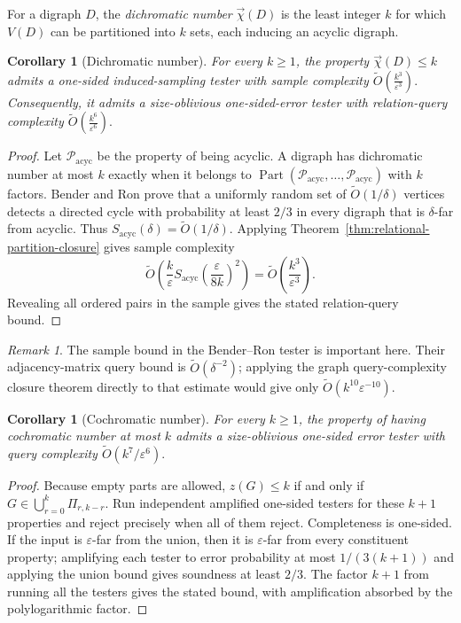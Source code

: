 \documentclass[11pt,reqno,letterpaper]{amsart}
\newcommand{\Part}{\operatorname{Part}}
\newcommand{\cP}{{\mathcal P}}
\theoremstyle{plain}
\newtheorem{cor}[thm]{Corollary}
\theoremstyle{remark}
\newtheorem{rem}[thm]{Remark}
\begin{document}
For a digraph $D$, the \textit{dichromatic number} $\vec\chi(D)$ is the least
integer $k$ for which $V(D)$ can be partitioned into $k$ sets, each inducing an
acyclic digraph.

\begin{cor}[Dichromatic number]\label{cor:dichromatic-number}
For every $k\geq1$, the property $\vec\chi(D)\leq k$ admits a one-sided
induced-sampling tester with sample complexity
\(\widetilde O\!\left(\frac{k^3}{\varepsilon^3}\right).\)
Consequently, it admits a size-oblivious one-sided-error tester with
relation-query complexity
\(\widetilde O\!\left(\frac{k^6}{\varepsilon^6}\right).\)
\end{cor}

\begin{proof}
Let $\cP_{\mathrm{acyc}}$ be the property of being acyclic.  A digraph has
dichromatic number at most $k$ exactly when it belongs to
$\Part(\cP_{\mathrm{acyc}},\ldots,\cP_{\mathrm{acyc}})$ with $k$ factors.
Bender and Ron \cite{bender2002testing} prove that a uniformly random set of
$\widetilde O(1/\delta)$ vertices detects a directed cycle with probability at
least $2/3$ in every digraph that is $\delta$-far from acyclic.  Thus
$S_{\mathrm{acyc}}(\delta)=\widetilde O(1/\delta)$.  Applying
Theorem~\ref{thm:relational-partition-closure} gives sample complexity
\[
\widetilde O\!\left(
\frac{k}{\varepsilon}
S_{\mathrm{acyc}}\!\left(\frac{\varepsilon}{8k}\right)^2
\right)
=\widetilde O\!\left(\frac{k^3}{\varepsilon^3}\right).
\]
Revealing all ordered pairs in the sample gives the stated relation-query
bound.
\end{proof}

\begin{rem}
The sample bound in the Bender--Ron tester is important here.  Their
adjacency-matrix query bound is $\widetilde O(\delta^{-2})$; applying the graph
query-complexity closure theorem directly to that estimate would give only
$\widetilde O(k^{10}\varepsilon^{-10})$.
\end{rem}

\begin{cor}[Cochromatic number]
\label{cor:cochromatic-number}
For every $k\geq1$, the property of having cochromatic number at most $k$ admits a size-oblivious one-sided error tester with query complexity
\(\widetilde O\!\left({k^7}/{\varepsilon^6}\right).
\)
\end{cor}

\begin{proof}
Because empty parts are allowed, $z(G)\leq k$ if and only if
$G\in\bigcup_{r=0}^{k}\Pi_{r,k-r}$.  Run independent amplified one-sided
testers for these $k+1$ properties and reject precisely when all of them
reject.  Completeness is one-sided.  If the input is $\varepsilon$-far from the
union, then it is $\varepsilon$-far from every constituent property; amplifying
each tester to error probability at most $1/(3(k+1))$ and applying the union
bound gives soundness at least $2/3$.  The factor $k+1$ from running all the
testers gives the stated bound, with amplification absorbed by the
polylogarithmic factor.
\end{proof}
\end{document}
